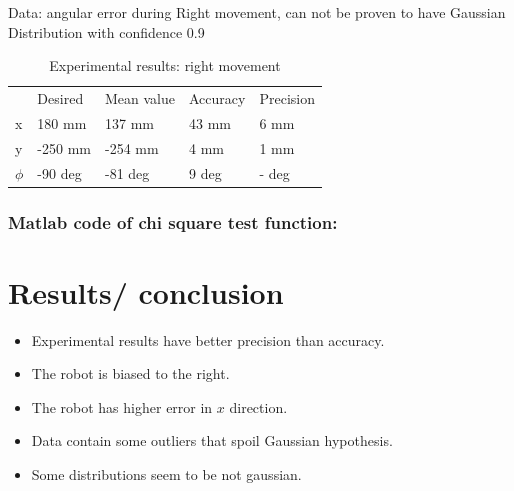\documentclass[a4paper, 12pt]{article}
\begin{document}
\smallskip


Data:  angular error during   Right movement, can not be proven to have Gaussian Distribution with confidence 0.9%

\begin{table}[!h]
\centering
\caption{Experimental results: right movement}
\begin{tabular}{lllll}
     & Desired & Mean value & Accuracy & Precision \\
x    &  180  mm     &    137  mm      &    43  mm    &     6  mm    \\
y    &  -250 mm     &    -254  mm     &  4    mm    &    1   mm    \\
$\phi$ &  -90   deg    &     -81    deg   &     9 deg     & - deg
\end{tabular}
\end{table}

\newpage

\subsubsection{Matlab code of chi square test function:}



\section{Results/ conclusion}

\begin{itemize}
\item Experimental results have better precision than accuracy.
\item The robot is biased to the right.
\item The robot has higher error in $x$ direction.
\item Data contain some outliers that spoil Gaussian hypothesis.
\item Some distributions seem to be not gaussian.
\end{itemize}
\end{document}
